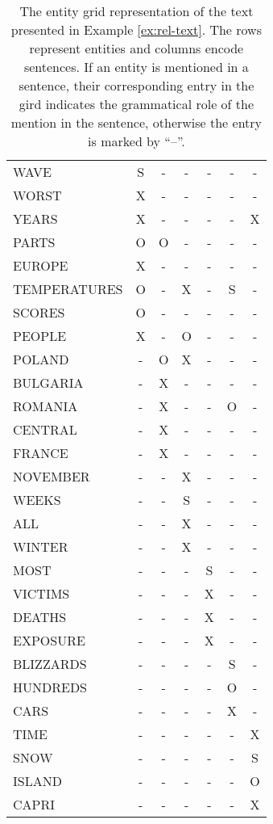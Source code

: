 \begin{table}[!ht]	
	\begin{center}
		\begin{tabular}{lcccccc}
			\hline
			WAVE 			& S & - & - & - & - & - \\
			WORST 			& X & - & - & - & - & - \\
			YEARS 			& X & - & - & - & - & X \\
			PARTS 			& O & O & - & - & - & - \\
			EUROPE  		& X & - & - & - & - & - \\
			TEMPERATURES  	& O & - & X & - & S & - \\
			SCORES  		& O & - & - & - & - & - \\
			PEOPLE  		& X & - & O & - & - & - \\
			POLAND 			& - & O & X & - & - & - \\
			BULGARIA  		& - & X & - & - & - & - \\
			ROMANIA  		& - & X & - & - & O & - \\
			CENTRAL  		& - & X & - & - & - & - \\
			FRANCE  		& - & X & - & - & - & - \\
			NOVEMBER  		& - & - & X & - & - & - \\
			WEEKS 			& - & - & S & - & - & - \\
			ALL 			& - & - & X & - & - & - \\
			WINTER  		& - & - & X & - & - & - \\
			MOST 			& - & - & - & S & - & - \\
			VICTIMS  		& - & - & - & X & - & - \\
			DEATHS 			& - & - & - & X & - & - \\
			EXPOSURE  		& - & - & - & X & - & - \\
			BLIZZARDS  		& - & - & - & - & S & - \\
			HUNDREDS  		& - & - & - & - & O & - \\
			CARS  			& - & - & - & - & X & - \\
			TIME  			& - & - & - & - & - & X \\
			SNOW  			& - & - & - & - & - & S \\
			ISLAND 			& - & - & - & - & - & O \\
			CAPRI 			& - & - & - & - & - & X \\
			\hline
		\end{tabular}
		\caption{The entity grid representation of the text presented in Example \ref{ex:rel-text}. The rows represent entities and columns encode sentences. 
		If an entity is mentioned in a sentence, their corresponding entry in the gird indicates the grammatical role of the mention in the sentence, otherwise the entry is marked by ``--''.} 
		\label{tab:rel-egrid}
	\end{center}
\end{table}


